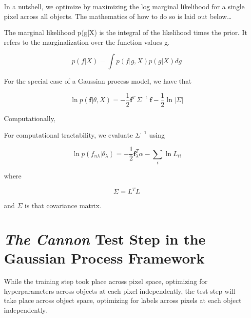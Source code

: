 \documentclass[12pt, preprint]{aastex}
\begin{document}
In a nutshell, we optimize by maximizing the log marginal likelihood for a 
single pixel across all objects. The mathematics of how to do so is laid out 
below\ldots

The marginal likelihood p(g|X) is the integral of the likelihood times the
prior. It refers to the marginalization over the function values g.  

\begin{equation}
  p(f|X) = \int p(f|g,X) p(g|X)dg
  \label{}
\end{equation}

For the special case of a Gaussian process model, we have that 

\begin{equation}
  \ln{p}(\textbf{f} | \theta, X) = 
  -\frac{1}{2} \textbf{f}^{T}\,\Sigma^{-1}\,\textbf{f}-\frac{1}{2}\ln{|\Sigma|}
\end{equation}

Computationally, 

For computational tractability, we evaluate $\Sigma^{-1}$ using 

\begin{equation}
  \ln{p}(f_{n \lambda} | \theta_\lambda) = 
  -\frac{1}{2} \textbf{f}_{\lambda}^T \alpha - \sum_i \ln{L_{ii}}
\end{equation}

where

\begin{equation}
  \Sigma = L^T L  
  \label{<++>}
\end{equation}

and $\Sigma$ is that covariance matrix. 



\section{\emph{The Cannon} Test Step in the Gaussian Process Framework}

While the training step took place across pixel space, optimizing for 
hyperparameters across objects at each pixel independently, the test step 
will take place across object space, optimizing for labels across pixels at 
each object independently.
\end{document}
